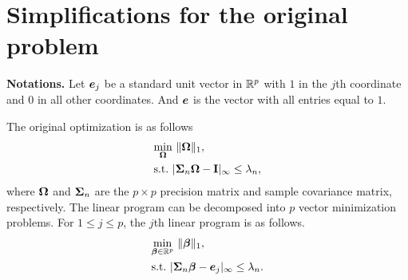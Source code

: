 \section{Simplifications for the original problem}

\noindent\textbf{Notations.} Let $\boldsymbol{e}_j$ be a standard unit vector in ${\mathbb R}^p$ with $1$ in the $j$th coordinate and $0$ in all other coordinates. And $\boldsymbol{e}$ is the vector with all entries equal to $1$.

The original optimization is as follows
\begin{align*}
     & \underset{\boldsymbol{\Omega}}{\min}~\|\boldsymbol{\Omega}\|_{1},
    \\
     & \text{s.t.}~ \vert \boldsymbol{\Sigma}_n\boldsymbol{\Omega} - {\bf I} \vert_{\infty} \leq \lambda_n,
\end{align*}
where $\boldsymbol{\Omega}$ and $\boldsymbol{\Sigma}_n$ are the $p\times p$ precision matrix and sample covariance matrix, respectively. The linear program can be decomposed into $p$ vector minimization problems. For $1\leq j \leq p$, the $j$th linear program is as follows.
\begin{equation}\label{original:opt}
    \begin{aligned}
         & \underset{\boldsymbol{\beta}\in{\mathbb R}^p}{\min}~\|\boldsymbol{\beta}\|_1,
        \\
         & \text{s.t.}~ \vert \boldsymbol{\Sigma}_n\boldsymbol{\beta} - \boldsymbol{e}_j \vert_{\infty} \leq \lambda_n.
    \end{aligned}
\end{equation}

